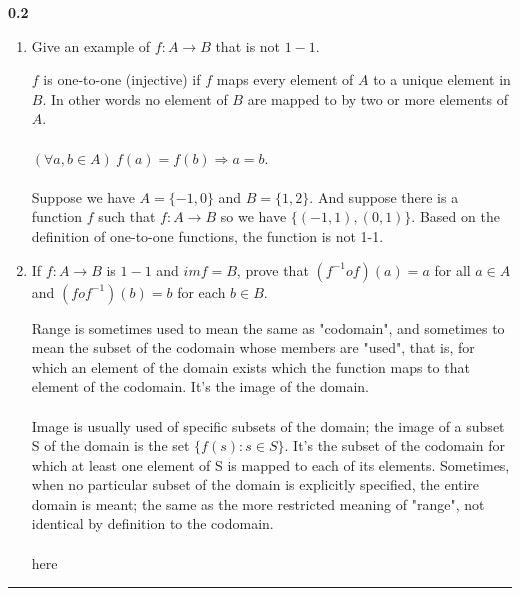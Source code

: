 \documentclass[fleqn]{article}
\begin{document}
  \textbf{0.2}
  \begin{enumerate}
    \item Give an example of $f: A \rightarrow B$ that is not $1-1$.

      \textcolor{hwColor}{
        $f$ is one-to-one (injective) if $f$ maps every element of $A$ to a unique element in $B$. 
        In other words no element of $B$ are mapped to by two or more elements of $A$.
        \\
        \\
        $
          \left( \forall a,b \in A \right) ~ f(a)=f(b) \Rightarrow a=b.
        $
        \\
        \\
        Suppose we have $A=\{-1,0\}$ and $B=\{1, 2\}$. And suppose there is a function $f$
        such that $f: A \rightarrow B$ so we have $\{ (-1,1), (0,1)\}$. Based on the 
        definition of one-to-one functions, the function is not 1-1.
        \\
      }

    \item If $f: A \rightarrow B$ is $1-1$ and $im f=B$, prove that $(f^{-1}of)(a)=a$
    for all $a \in A$ and $(fof^{-1})(b)=b$ for each $b \in B$.

      \textcolor{hwColor}{
        Range is sometimes used to mean the same as "codomain", and sometimes to mean the subset of the codomain whose members are "used", 
        that is, for which an element of the domain exists which the function maps to that element of the codomain. It’s the image of the domain.
        \\
        \\
        Image is usually used of specific subsets of the domain; the image of a subset  S  of the domain is the set $\{f(s): s \in S \}$. 
        It’s the subset of the codomain for which at least one element of  S  is mapped to each of its elements. Sometimes, 
        when no particular subset of the domain is explicitly specified, the entire domain is meant; the same as the more 
        restricted meaning of "range", not identical by definition to the codomain.
        \\
        \\
        here
      }

  \end{enumerate}

  \rule{15cm}{2pt}
\end{document}
